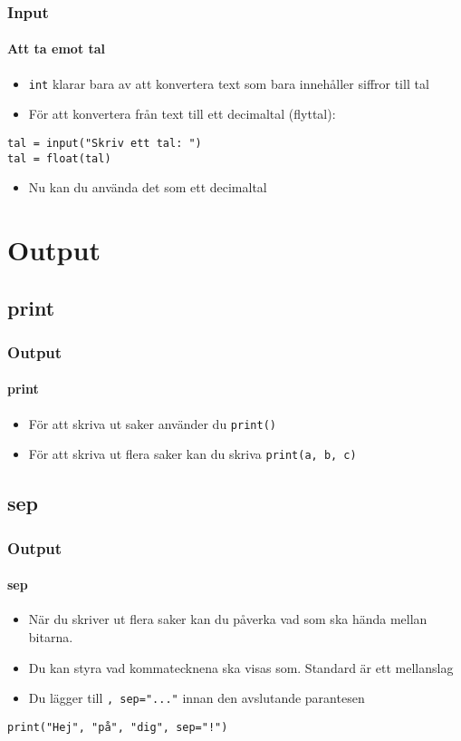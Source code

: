 \documentclass[aspectratio=169]{beamer}
\begin{document}
\begin{frame}[fragile]
	\frametitle{Input}
	\framesubtitle{Att ta emot tal}
	
	\begin{itemize}
		\item \texttt{int} klarar bara av att konvertera text som bara innehåller siffror till tal
		\item För att konvertera från text till ett decimaltal (flyttal):
	\end{itemize}
	
	\begin{lstlisting}
tal = input("Skriv ett tal: ")
tal = float(tal)
	\end{lstlisting}
	
	\begin{itemize}
		\item Nu kan du använda det som ett decimaltal
	\end{itemize}
	
\end{frame}

\section{Output}

\subsection{print}

\begin{frame}[fragile]
	\frametitle{Output}
	\framesubtitle{print}
	
	\begin{itemize}
		\item För att skriva ut saker använder du \lstinline{print()}
		\item För att skriva ut flera saker kan du skriva \lstinline{print(a, b, c)}
	\end{itemize}
	
\end{frame}

\subsection{sep}

\begin{frame}[fragile]
	\frametitle{Output}
	\framesubtitle{sep}
	
	\begin{itemize}
		\item När du skriver ut flera saker kan du påverka vad som ska hända mellan bitarna.
		\item Du kan styra vad kommatecknena ska visas som. Standard är ett mellanslag
		\item Du lägger till \lstinline{, sep="..."} innan den avslutande parantesen
	\end{itemize}
	
	\begin{lstlisting}
print("Hej", "på", "dig", sep="!")
	\end{lstlisting}
	
\end{frame}
\end{document}
